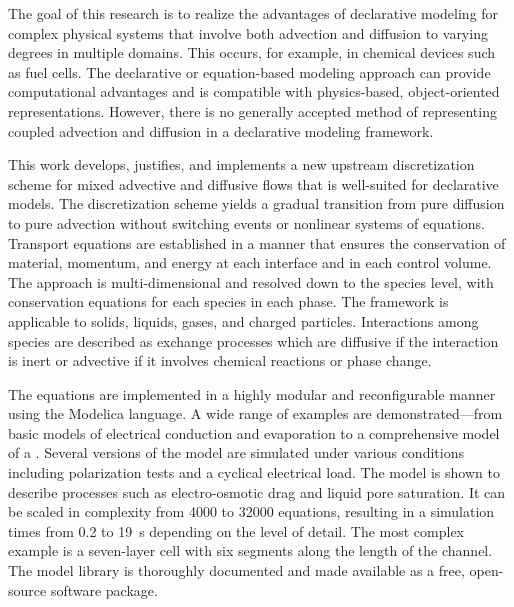 
The goal of this research is to realize the advantages of declarative modeling for complex physical systems that involve both advection and diffusion to varying degrees in multiple domains.  This occurs, for example, in chemical devices such as fuel cells.  The declarative or equation-based modeling approach can provide computational advantages and is compatible with physics-based, object-oriented representations.  However, there is no generally accepted method of representing coupled advection and diffusion in a declarative modeling framework.  

This work develops, justifies, and implements a new upstream discretization scheme for mixed advective and diffusive flows that is well-suited for declarative models.  The discretization scheme yields a gradual transition from pure diffusion to pure advection without switching events or nonlinear systems of equations.  Transport equations are established in a manner that ensures the conservation of material, momentum, and energy at each interface and in each control volume.  The approach is multi-dimensional and resolved down to the species level, with conservation equations for each species in each phase.  The framework is applicable to solids, liquids, gases, and charged particles.  Interactions among species are described as exchange processes which are diffusive if the interaction is inert or advective if it involves chemical reactions or phase change.

The equations are implemented in a highly modular and reconfigurable manner using the Modelica language.  A wide range of examples are demonstrated---from basic models of electrical conduction and evaporation to a comprehensive model of a .  Several versions of the  model are simulated under various conditions including polarization tests and a cyclical electrical load.  The model is shown to describe processes such as electro-osmotic drag and liquid pore saturation.  It can be scaled in complexity from \num{4000} to \num{32000} equations, resulting in a simulation times from 0.2 to \SI{19}{s} depending on the level of detail.  The most complex example is a seven-layer cell with six segments along the length of the channel.  The model library is thoroughly documented and made available as a free, open-source software package.


\glsresetall
